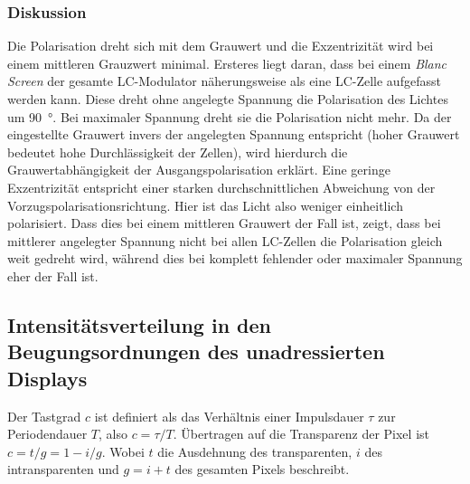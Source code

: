 \documentclass[
	a4paper,
	12pt,
	pagesize,
	ngerman
]{scrartcl}
\begin{document}
			\subsubsection*{Diskussion}
			Die Polarisation dreht sich mit dem Grauwert und die Exzentrizität wird bei einem mittleren Grauzwert minimal.
			Ersteres liegt daran, dass bei einem \textit{Blanc Screen} der gesamte LC-Modulator näherungsweise als eine LC-Zelle aufgefasst werden kann.
			Diese dreht ohne angelegte Spannung die Polarisation des Lichtes um \SI{90}{\degree}.
			Bei maximaler Spannung dreht sie die Polarisation nicht mehr.
			Da der eingestellte Grauwert invers der angelegten Spannung entspricht (hoher Grauwert bedeutet hohe Durchlässigkeit der Zellen), wird hierdurch die Grauwertabhängigkeit der Ausgangspolarisation erklärt.
			Eine geringe Exzentrizität entspricht einer starken durchschnittlichen Abweichung von der Vorzugspolarisationsrichtung.
			Hier ist das Licht also weniger einheitlich polarisiert.
			Dass dies bei einem mittleren Grauwert der Fall ist, zeigt, dass bei mittlerer angelegter Spannung nicht bei allen LC-Zellen die Polarisation gleich weit gedreht wird, während dies bei komplett fehlender oder maximaler Spannung eher der Fall ist.

		\subsection{Intensitätsverteilung in den Beugungsordnungen des unadressierten Displays}

		Der Tastgrad $c$ ist definiert als das Verhältnis einer Impulsdauer $\tau$ zur Periodendauer $T$, also $c=\tau/T$.
		Übertragen auf die Transparenz der Pixel ist $c=t/g=1-i/g$.
		Wobei $t$ die Ausdehnung des transparenten, $i$ des intransparenten und $g=i+t$ des gesamten Pixels beschreibt.
\end{document}
